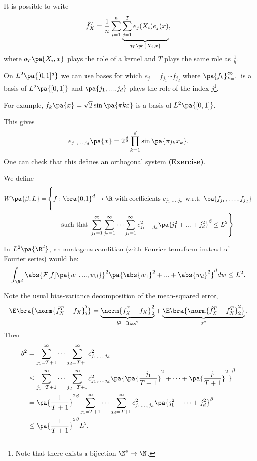 \begin{enumerate}
It is possible to write
\begin{equation}
  \hat{f}_X^T=\frac{1}{n} \sum_{i=1}^n \underbrace{\sum_{j=1}^T e_j(X_i)e_j(x)}_{q_T\pa{X_i,x}},
\end{equation}
where $q_T\pa{X_i,x}$ plays the role of a kernel and $T$ plays the same role as $\frac{1}{h}$.

On $L^2\pa{[0,1]^d}$ we can use bases for which $e_j=f_{j_1}\cdots f_{j_d}$ where $\pa{f_k}_{k=1}^\infty$ is a basis of $L^2\pa{[0,1]}$ and $\pa{j_1,...,j_d}$ plays the role of the index $j$\footnote{Note that there exists a bijection $\N^d\rightarrow \N$.}.

For example, $f_{k}\pa{x} = \sqrt{2}\sin\pa{\pi k x}$ is a basis of $L^2\pa{[0,1]}$.

This gives
\begin{equation}
  e_{j_1,\ldots,j_d} \pa{x} = 2^{\frac{d}{2}} \prod_{k=1}^d \sin\pa{\pi j_k x_k}.
\end{equation}
One can check that this defines an orthogonal system \textbf{(Exercise)}.

We define
\begin{equation}
\begin{split}
W\pa{\beta, L} = &\left\{ \vphantom{\sum_{j_d=1}^\infty}f: \bra{0,1}^d\rightarrow \R \text{ with coefficients } c_{{j_1},\ldots,{j_d}}\text{ w.r.t. } \pa{f_{j_1}, \ldots, f_{j_d}} \right.  \\
&\quad\quad \left. \text{such that } \sum_{j_1=1}^\infty \sum_{j_2=1}^\infty\cdots \sum_{j_d=1}^\infty c_{j_1,...,j_d}^2\pa{j_1^2+...+j_d^2}^\beta\leq L^2 \right\}
\end{split}
\end{equation}

{\color{olive}In $L^2\pa{\R^d}$, an analogous condition (with Fourier transform instead of Fourier series) would be:
\begin{equation}
\int_{\R^d} \abs{\mathcal F[f]\pa{w_1,...,w_d}}^2\pa{\abs{w_1}^2+...+\abs{w_d}^2}^\beta dw \leq L^2.
\end{equation}}

Note the usual bias-variance decomposition of the mean-squared error,
\begin{equation}
  \E\bra{\norm{\hat f_X^T - f_X}^2_2} = \underbrace{\norm{f_X^T - f_X }^2_2}_{b^2=\text{Bias}^2} + \underbrace{\E\bra{\norm{\hat{f}_X^T - f_X^T}_2^2}}_{\sigma^2}.
\end{equation}
Then
\begin{equation}
\begin{split}
  b^2 &= \sum_{j_1 = T+1}^\infty \cdots \sum_{j_d = T+1}^\infty c^2_{j_1,\ldots, j_d} \\
  &\leq \sum_{j_1 = T+1}^\infty \cdots \sum_{j_d = T+1}^\infty c^2_{j_1,\ldots, j_d} \pa{\pa{\frac{j_1}{T+1}}^2 + \cdots + \pa{\frac{j_1}{T+1}}^2}^\beta \\
  &= \pa{\frac{1}{T+1}}^{2\beta } \sum_{j_1 = T+1}^\infty \cdots \sum_{j_d = T+1}^\infty c^2_{j_1,\ldots, j_d} \pa{j_1^2 + \cdots + j_d^2}^\beta \\
  &\leq \pa{\frac{1}{T+1}}^{2\beta} L^2.
\end{split}
\end{equation}


\end{enumerate}
